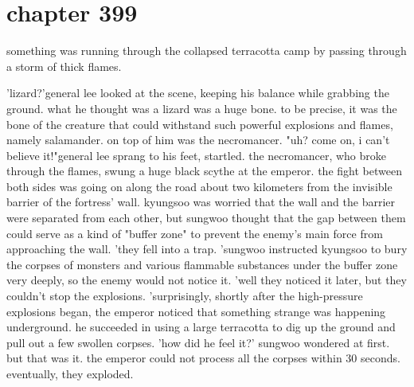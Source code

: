 \section{chapter 399}

something was running through the collapsed terracotta camp by passing through a storm of thick flames.





'lizard?'general lee looked at the scene, keeping his balance while grabbing the ground.
what he thought was a lizard was a huge bone.
 to be precise, it was the bone of the creature that could withstand such powerful explosions and flames, namely salamander.
on top of him was the necromancer.
"uh? come on, i can't believe it!"general lee sprang to his feet, startled.
the necromancer, who broke through the flames, swung a huge black scythe at the emperor.
the fight between both sides was going on along the road about two kilometers from the invisible barrier of the fortress' wall.
kyungsoo was worried that the wall and the barrier were separated from each other, but sungwoo thought that the gap between them could serve as a kind of "buffer zone" to prevent the enemy's main force from approaching the wall.
 'they fell into a trap.
'sungwoo instructed kyungsoo to bury the corpses of monsters and various flammable substances under the buffer zone very deeply, so the enemy would not notice it.
'well they noticed it later, but they couldn't stop the explosions.
'surprisingly, shortly after the high-pressure explosions began, the emperor noticed that something strange was happening underground.
 he succeeded in using a large terracotta to dig up the ground and pull out a few swollen corpses.
'how did he feel it?' sungwoo wondered at first.
but that was it.
 the emperor could not process all the corpses within 30 seconds.
eventually, they exploded.

